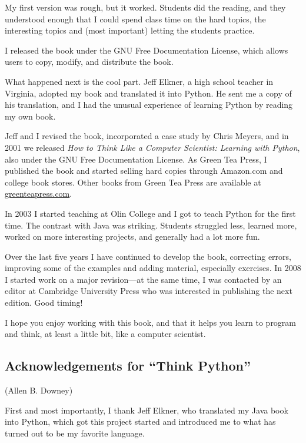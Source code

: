 \documentclass[11pt]{book}
\begin{document}
My first version was rough, but it worked.  Students did the reading,
and they understood enough that I could spend class time on the hard
topics, the interesting topics and (most important) letting the
students practice.

I released the book under the GNU Free Documentation License,
which allows users to copy, modify, and distribute the book.


What happened next is the cool part.  Jeff Elkner, a high school
teacher in Virginia, adopted my book and translated it into
Python.  He sent me a copy of his translation, and I had the
unusual experience of learning Python by reading my own book.

Jeff and I revised the book, incorporated a case study by
Chris Meyers, and in 2001 we released \emph{How to Think Like
a Computer Scientist: Learning with Python}, also under
the GNU Free Documentation License.
As Green Tea Press, I published the book and started selling
hard copies through Amazon.com and college book stores.
Other books from Green Tea Press are available at
\url{greenteapress.com}.

In 2003 I started teaching at Olin College and I got to teach
Python for the first time.  The contrast with Java was striking.
Students struggled less, learned more, worked on more interesting
projects, and generally had a lot more fun.

Over the last five years I have continued to develop the book,
correcting errors, improving some of the examples and
adding material, especially exercises.  In 2008 I started work
on a major revision---at the same time, I was
contacted by an editor at Cambridge University Press who
was interested in publishing the next edition.  Good timing!

I hope you enjoy working with this book, and that it helps
you learn to program and think, at least a little bit, like
a computer scientist.

\subsection*{Acknowledgements for ``Think Python''}

(Allen B. Downey)

First and most importantly, I thank Jeff Elkner, who
translated my Java book into Python, which got this project
started and introduced me to what has turned out to be my
favorite language.
\end{document}
